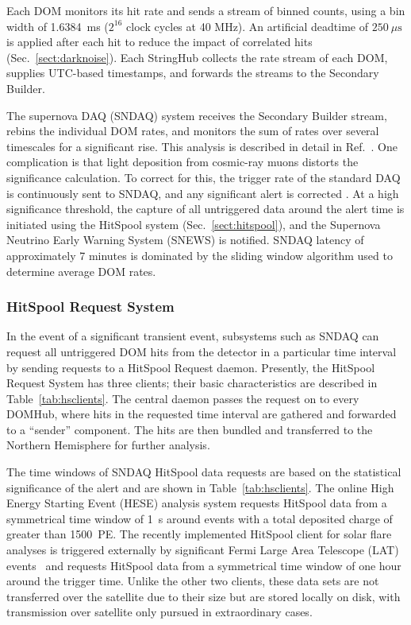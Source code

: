Each DOM monitors its hit rate and sends a stream of binned counts, using a
bin width of 1.6384~ms ($2^{16}$ clock cycles at 40 MHz).  An artificial
deadtime of $250\ {\mu}\mathrm{s}$ is applied after each hit to reduce the
impact of correlated hits (Sec.~\ref{sect:darknoise}).  Each
StringHub collects the rate stream of each DOM, supplies UTC-based timestamps,
and forwards the streams to the Secondary Builder.

The supernova DAQ (SNDAQ) system receives the Secondary Builder stream,
rebins the individual DOM rates, and monitors the sum of rates over several
timescales for a significant rise.  This analysis is described in
detail in Ref.~\cite{IC3:supernova}.  One complication is that light
deposition from cosmic-ray muons distorts the significance
calculation.  To correct for this, the trigger rate of the standard DAQ is
continuously sent to SNDAQ, and any significant alert is corrected
\cite{IC3:icrc15_sndaq}.  At a high significance threshold, the capture of
all untriggered data around the alert time is initiated using the HitSpool
system (Sec.~\ref{sect:hitspool}), and the Supernova Neutrino Early Warning
System (SNEWS) \cite{SNEWS} is notified.  SNDAQ latency of approximately 7
minutes is dominated by the sliding window algorithm used to determine
average DOM rates. 

\subsubsection{\label{sect:hitspool}HitSpool Request System}

In the event of a significant transient event, subsystems such as SNDAQ can
request all untriggered DOM hits from the detector in 
a particular time interval by sending requests to a HitSpool Request daemon. Presently,
the HitSpool Request System has three clients; 
their basic characteristics are described in
Table~\ref{tab:hsclients}.  The central daemon passes the request on to 
every DOMHub, where hits in the requested time
interval are gathered and forwarded to a ``sender'' component.  The hits
are then bundled and transferred to the Northern Hemisphere for further analysis.

The time windows of SNDAQ HitSpool data requests are based on the
statistical significance of the alert and are shown in
Table~\ref{tab:hsclients}. The online High Energy Starting Event (HESE) 
analysis system requests HitSpool data from a symmetrical time window of
1~s around events with a total deposited charge of greater than 1500~PE.
The recently implemented HitSpool client for solar flare analyses is
triggered externally by significant Fermi Large Area Telescope (LAT) events~\cite{fermilat:flare}
and requests HitSpool 
data from a symmetrical time window of one hour around the trigger
time. Unlike the other two clients, these data sets are not transferred
over the satellite due to their size but are stored locally on disk, with
transmission over satellite only pursued in extraordinary cases.

